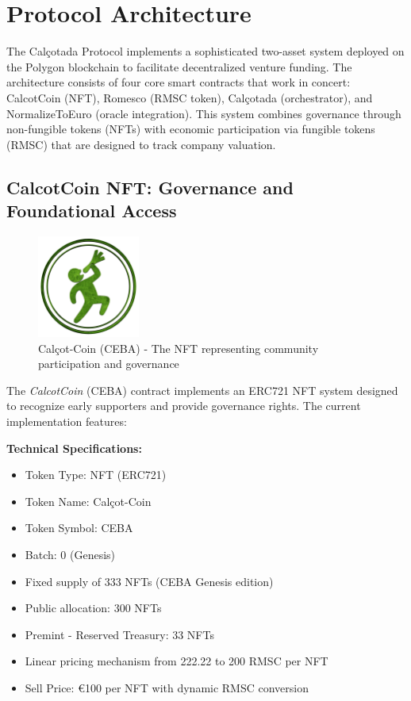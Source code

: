\documentclass[conference]{IEEEtran}
\begin{document}
\section{Protocol Architecture}



The Calçotada Protocol implements a sophisticated two-asset system deployed on the Polygon blockchain to facilitate decentralized venture funding. The architecture consists of four core smart contracts that work in concert: CalcotCoin (NFT), Romesco (RMSC token), Calçotada (orchestrator), and NormalizeToEuro (oracle integration). This system combines governance through non-fungible tokens (NFTs) with economic participation via fungible tokens (RMSC) that are designed to track company valuation.

\subsection{CalcotCoin NFT: Governance and Foundational Access}

\begin{figure}[ht]
\centering
\includegraphics[width=0.3\textwidth]{calcot-coin-logo.png}
\caption{Calçot-Coin (CEBA) - The NFT representing community participation and governance}
\label{fig:calcotcoin-logo}
\end{figure}

The \textit{CalcotCoin} (CEBA) contract implements an ERC721 NFT system designed to recognize early supporters and provide governance rights. The current implementation features:

\textbf{Technical Specifications:}
\begin{itemize}
    \item Token Type: NFT (ERC721)
    \item Token Name: Calçot-Coin
    \item Token Symbol: CEBA
    \item Batch: 0 (Genesis)
    \item Fixed supply of 333 NFTs (CEBA Genesis edition)
    \item Public allocation: 300 NFTs
    \item Premint - Reserved Treasury: 33 NFTs
    \item Linear pricing mechanism from 222.22 to 200 RMSC per NFT
    \item Sell Price: €100 per NFT with dynamic RMSC conversion
\end{itemize}
\end{document}
